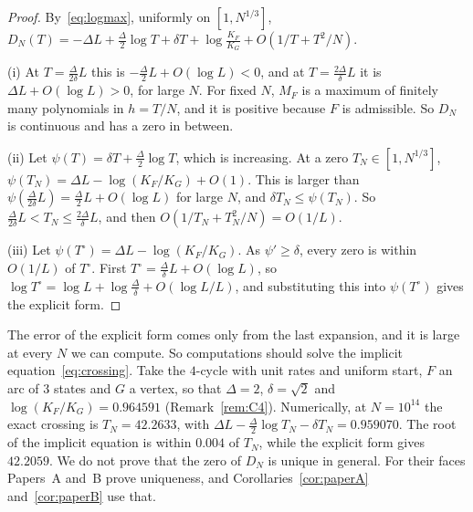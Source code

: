 \begin{proof}
By~\eqref{eq:logmax}, uniformly on $[1,N^{1/3}]$,
$D_N(T)=-\Delta L+\frac\Delta2\log T+\delta T+\log\frac{K_F}{K_G}+O(1/T+T^2/N)$.

(i) At $T=\frac{\Delta}{2\delta}L$ this is $-\frac\Delta2L+O(\log L)<0$, and at
$T=\frac{2\Delta}\delta L$ it is $\Delta L+O(\log L)>0$, for large $N$. For
fixed $N$, $M_F$ is a maximum of finitely many polynomials in $h=T/N$, and it
is positive because $F$ is admissible. So $D_N$ is continuous and has a zero
in between.

(ii) Let $\psi(T)=\delta T+\frac\Delta2\log T$, which is increasing. At a zero
$T_N\in[1,N^{1/3}]$, $\psi(T_N)=\Delta L-\log(K_F/K_G)+O(1)$. This is larger
than $\psi(\frac\Delta{2\delta}L)=\frac\Delta2L+O(\log L)$ for large $N$, and
$\delta T_N\le\psi(T_N)$. So $\frac\Delta{2\delta}L<T_N\le\frac{2\Delta}\delta L$,
and then $O(1/T_N+T_N^2/N)=O(1/L)$.

(iii) Let $\psi(T^\circ)=\Delta L-\log(K_F/K_G)$. As $\psi'\ge\delta$, every
zero is within $O(1/L)$ of $T^\circ$. First
$T^\circ=\frac\Delta\delta L+O(\log L)$, so
$\log T^\circ=\log L+\log\frac\Delta\delta+O(\log L/L)$, and substituting
this into $\psi(T^\circ)$ gives the explicit form.
\end{proof}

The error of the explicit form comes only from the last expansion, and it is
large at every $N$ we can compute. So computations should solve the implicit
equation~\eqref{eq:crossing}. Take the $4$-cycle with unit rates and uniform
start, $F$ an arc of $3$ states and $G$ a vertex, so that $\Delta=2$,
$\delta=\sqrt2$ and $\log(K_F/K_G)=0.964591$ (Remark~\ref{rem:C4}).
Numerically, at $N=10^{14}$ the exact crossing is $T_N=42.2633$, with
$\Delta L-\frac\Delta2\log T_N-\delta T_N=0.959070$. The root of the implicit
equation is within $0.004$ of $T_N$, while the explicit form gives
$42.2059$. We do not prove that the zero of $D_N$ is unique in general.
For their faces Papers~A and~B prove uniqueness, and
Corollaries~\ref{cor:paperA} and~\ref{cor:paperB} use that.

